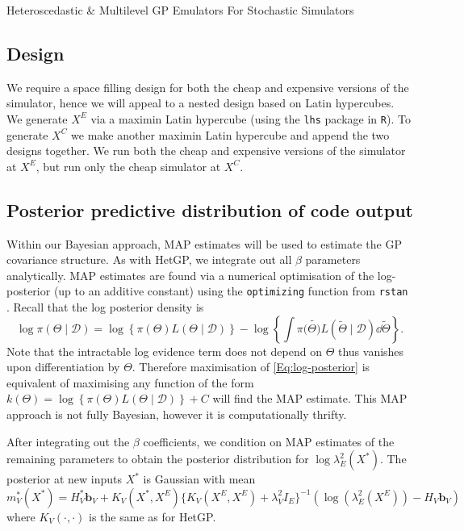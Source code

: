 \begin{chapter}{Heteroscedastic \& Multilevel GP Emulators For Stochastic Simulators\label{Ch:Hetsml}}
\subsection{Design \label{Sec:design}}
We require a space filling design for both the cheap and expensive versions of the simulator, hence we will appeal to a nested design based on Latin hypercubes. We generate $X^E$ via a maximin Latin hypercube \citep{Mckay1979} (using the \verb|lhs| package in \verb|R|). To generate $X^C$ we make another maximin Latin hypercube and append the two designs together. We run both the cheap and expensive versions of the simulator at $X^E$, but run only the cheap simulator at $X^C$.
\subsection{Posterior predictive distribution of code output}
\label{sec:postpred}
Within our Bayesian approach, MAP estimates will be used to estimate the GP covariance structure. As with HetGP, we integrate out all $\beta$ parameters analytically. MAP estimates are found via a numerical optimisation of the log-posterior (up to an additive constant) using the \verb|optimizing| function from \verb|rstan| \citep{stan}. Recall that the log posterior density is
\begin{equation}
	\log \pi(\Theta \mid \mathcal{D}) = \log \left\{ \pi(\Theta)L(\Theta \mid \mathcal{D}) \right\} - \log \left\{ \int   \pi(\tilde{\Theta)}L(\tilde{\Theta} \mid \mathcal{D}) \dd \tilde{\Theta} \right\}. \label{Eq:log-posterior}
\end{equation}
Note that the intractable log evidence term does not depend on $\Theta$ thus vanishes upon differentiation by $\Theta$. Therefore maximisation of \cref{Eq:log-posterior} is equivalent of maximising any function of the form $k(\Theta) = \log \left\{ \pi(\Theta)L(\Theta \mid \mathcal{D}) \right\} + C$ will find the MAP estimate. This MAP approach is not fully Bayesian, however it is computationally thrifty.

After integrating out the $\beta$ coefficients, we condition on MAP estimates of the remaining parameters to obtain the posterior distribution for $\log \lambda^2_E (X^{*})$. The posterior at new inputs $X^{*}$ is Gaussian with mean
\begin{equation*}
m^*_V (X^{*}) = H^{*}_V \bm{b}_V + K_V(X^{*}, X^E) \big\{ K_V(X^E, X^E) + \lambda_{V}^2 I_E \big\} ^{-1} (\log (\lambda^2_E(X^E)) - H_V \bm{b}_V )
\end{equation*}
where $K_V(\cdot, \cdot)$ is the same as for HetGP.


\end{chapter}
